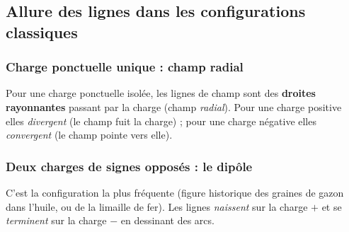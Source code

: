 \documentclass[11pt,a4paper]{article}
\begin{document}
\subsection{Allure des lignes dans les configurations classiques}

\subsubsection{Charge ponctuelle unique : champ radial}

Pour une charge ponctuelle isolée, les lignes de champ sont des \textbf{droites rayonnantes} passant
par la charge (champ \emph{radial}). Pour une charge positive elles \emph{divergent} (le champ
fuit la charge) ; pour une charge négative elles \emph{convergent} (le champ pointe vers elle).

\begin{center}
\end{center}

\subsubsection{Deux charges de signes opposés : le dipôle}

C'est la configuration la plus fréquente (figure historique des graines de gazon dans l'huile, ou
de la limaille de fer). Les lignes \emph{naissent} sur la charge $+$ et se \emph{terminent} sur la
charge $-$ en dessinant des arcs.
\end{document}
